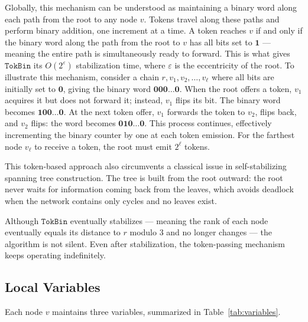 \documentclass[a4paper, 12pt]{article}
\newcommand{\bz}{\mathbf{0}}
\newcommand{\bo}{\mathbf{1}}
\begin{document}
Globally, this mechanism can be understood as maintaining a binary 
word along each path from the root to any node $v$. Tokens travel 
along these paths and perform binary addition, one increment at a 
time. A token reaches $v$ if and only if the binary word along the 
path from the root to $v$ has all bits set to $\bo$ — meaning the 
entire path is simultaneously ready to forward. This is what gives 
$\mathtt{TokBin}$ its $O(2^\varepsilon)$ stabilization time, where 
$\varepsilon$ is the eccentricity of the root.
To illustrate this mechanism, consider a chain $r, v_1, v_2, \dots, v_\ell$ where all bits are 
initially set to $\bz$, giving the binary word $\bz\bz\bz\dots\bz$. 
When the root offers a token, $v_1$ acquires it but does not forward 
it; instead, $v_1$ flips its bit. The binary word becomes 
$\bo\bz\bz\dots\bz$. At the next token offer, $v_1$ forwards the 
token to $v_2$, flips back, and $v_2$ flips: the word becomes 
$\bz\bo\bz\dots\bz$. This process continues, effectively incrementing 
the binary counter by one at each token emission. For the farthest 
node $v_\ell$ to receive a token, the root must emit $2^\ell$ tokens.

This token-based approach also circumvents a classical issue in 
self-stabilizing spanning tree construction. The tree is built from 
the root outward: the root never waits for information coming back 
from the leaves, which avoids deadlock when the network contains only 
cycles and no leaves exist.

Although $\mathtt{TokBin}$ eventually stabilizes — meaning the rank 
of each node eventually equals its distance to $r$ modulo $3$ and no 
longer changes — the algorithm is not silent. Even after stabilization, 
the token-passing mechanism keeps operating indefinitely. 

\subsection{Local Variables}

Each node $v$ maintains three variables, summarized in Table~\ref{tab:variables}.
\end{document}
